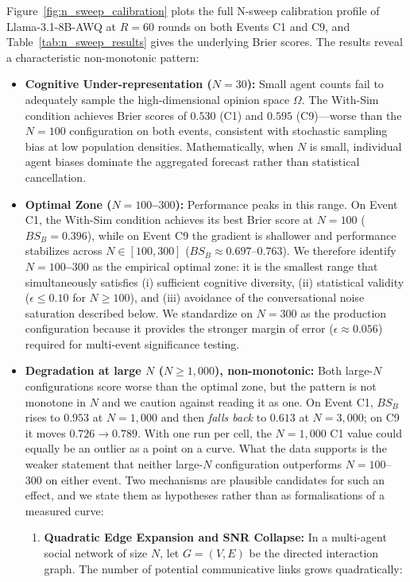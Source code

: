 \documentclass[11pt,journal,onecolumn]{IEEEtran}
\begin{document}
Figure~\ref{fig:n_sweep_calibration} plots the full N-sweep calibration profile of Llama-3.1-8B-AWQ at $R=60$ rounds on both Events C1 and C9, and Table~\ref{tab:n_sweep_results} gives the underlying Brier scores. The results reveal a characteristic non-monotonic pattern:

\begin{itemize}
    \item \textbf{Cognitive Under-representation ($N = 30$):} Small agent counts fail to adequately sample the high-dimensional opinion space $\Omega$. The With-Sim condition achieves Brier scores of $0.530$ (C1) and $0.595$ (C9)---worse than the $N=100$ configuration on both events, consistent with stochastic sampling bias at low population densities. Mathematically, when $N$ is small, individual agent biases dominate the aggregated forecast rather than statistical cancellation.
    \item \textbf{Optimal Zone ($N = 100$--$300$):} Performance peaks in this range. On Event C1, the With-Sim condition achieves its best Brier score at $N=100$ ($BS_B = 0.396$), while on Event C9 the gradient is shallower and performance stabilizes across $N \in [100, 300]$ ($BS_B \approx 0.697$--$0.763$). We therefore identify \textbf{$N=100$--$300$} as the empirical optimal zone: it is the smallest range that simultaneously satisfies (i) sufficient cognitive diversity, (ii) statistical validity ($\epsilon \leq 0.10$ for $N \geq 100$), and (iii) avoidance of the conversational noise saturation described below. We standardize on $N=300$ as the production configuration because it provides the stronger margin of error ($\epsilon \approx 0.056$) required for multi-event significance testing.
    \item \textbf{Degradation at large $N$ ($N \geq 1{,}000$), non-monotonic:} Both large-$N$ configurations score worse than the optimal zone, but the pattern is not monotone in $N$ and we caution against reading it as one. On Event C1, $BS_B$ rises to $0.953$ at $N=1{,}000$ and then \emph{falls back} to $0.613$ at $N=3{,}000$; on C9 it moves $0.726 \to 0.789$. With one run per cell, the $N=1{,}000$ C1 value could equally be an outlier as a point on a curve. What the data supports is the weaker statement that neither large-$N$ configuration outperforms $N=100$--$300$ on either event. Two mechanisms are plausible candidates for such an effect, and we state them as hypotheses rather than as formalisations of a measured curve:
        \begin{enumerate}
            \item \textbf{Quadratic Edge Expansion and SNR Collapse:} In a multi-agent social network of size $N$, let $G = (V,E)$ be the directed interaction graph. The number of potential communicative links grows quadratically:

\end{enumerate}
\end{itemize}
\end{document}
